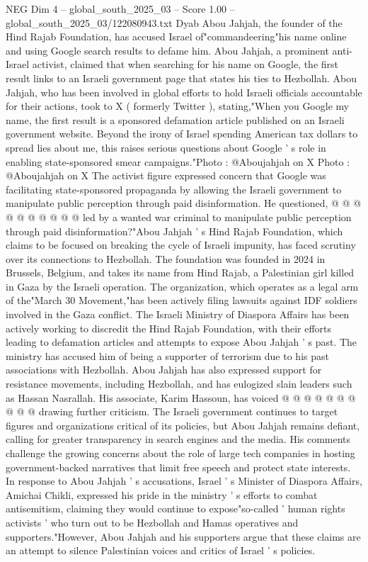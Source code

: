 \begin{textsample}{NEG Dim 4 – global\_south\_2025\_03 – Score 1.00 – global\_south\_2025\_03/122080943.txt}  \label{ex:f4_neg_423}
Dyab Abou Jahjah, the founder of the Hind Rajab Foundation, has accused Israel of"commandeering"his name online and using Google search results to defame him.
Abou Jahjah, a prominent anti-Israel activist, claimed that when searching for his name on Google, the first result links to an Israeli government page that states his ties to Hezbollah.
Abou Jahjah, who has been involved in global efforts to hold Israeli officials accountable for their actions, took to X ( formerly Twitter ), stating,"When you Google my name, the first result is a sponsored defamation article published on an Israeli government website.
Beyond the irony of Israel spending American tax dollars to spread lies about me, this raises serious questions about Google ' s role in enabling state-sponsored smear campaigns."Photo : @Aboujahjah on X Photo : @Aboujahjah on X The activist figure expressed concern that Google was facilitating state-sponsored propaganda by allowing the Israeli government to manipulate public perception through paid disinformation.
He questioned, @ @ @ @ @ @ @ @ @ @ led by a wanted war criminal to manipulate public perception through paid disinformation?"Abou Jahjah ' s Hind Rajab Foundation, which claims to be focused on breaking the cycle of Israeli impunity, has faced scrutiny over its connections to Hezbollah.
The foundation was founded in 2024 in Brussels, Belgium, and takes its name from Hind Rajab, a Palestinian girl killed in Gaza by the Israeli operation.
The organization, which operates as a legal arm of the"March 30 Movement,"has been actively filing lawsuits against IDF soldiers involved in the Gaza conflict.
The Israeli Ministry of Diaspora Affairs has been actively working to discredit the Hind Rajab Foundation, with their efforts leading to defamation articles and attempts to expose Abou Jahjah ' s past.
The ministry has accused him of being a supporter of terrorism due to his past associations with Hezbollah.
Abou Jahjah has also expressed support for resistance movements, including Hezbollah, and has eulogized slain leaders such as Hassan Nasrallah.
His associate, Karim Hassoun, has voiced @ @ @ @ @ @ @ @ @ @ drawing further criticism.
The Israeli government continues to target figures and organizations critical of its policies, but Abou Jahjah remains defiant, calling for greater transparency in search engines and the media.
His comments challenge the growing concerns about the role of large tech companies in hosting government-backed narratives that limit free speech and protect state interests.
In response to Abou Jahjah ' s accusations, Israel ' s Minister of Diaspora Affairs, Amichai Chikli, expressed his pride in the ministry ' s efforts to combat antisemitism, claiming they would continue to expose"so-called ' human rights activists ' who turn out to be Hezbollah and Hamas operatives and supporters."However, Abou Jahjah and his supporters argue that these claims are an attempt to silence Palestinian voices and critics of Israel ' s policies.

\end{textsample}
